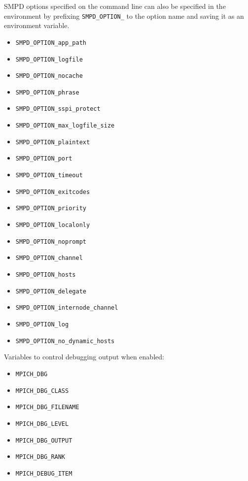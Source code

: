 \documentclass[dvipdfm,11pt]{article}
\begin{document}
SMPD options specified on the command line can also be specified in the environment
by prefixing \texttt{SMPD\_OPTION\_} to the option name and saving it as an
environment variable.
\begin{itemize}
\item \texttt{SMPD\_OPTION\_app\_path}
\item \texttt{SMPD\_OPTION\_logfile}
\item \texttt{SMPD\_OPTION\_nocache}
\item \texttt{SMPD\_OPTION\_phrase}
\item \texttt{SMPD\_OPTION\_sspi\_protect}
\item \texttt{SMPD\_OPTION\_max\_logfile\_size}
\item \texttt{SMPD\_OPTION\_plaintext}
\item \texttt{SMPD\_OPTION\_port}
\item \texttt{SMPD\_OPTION\_timeout}
\item \texttt{SMPD\_OPTION\_exitcodes}
\item \texttt{SMPD\_OPTION\_priority}
\item \texttt{SMPD\_OPTION\_localonly}
\item \texttt{SMPD\_OPTION\_noprompt}
\item \texttt{SMPD\_OPTION\_channel}
\item \texttt{SMPD\_OPTION\_hosts}
\item \texttt{SMPD\_OPTION\_delegate}
\item \texttt{SMPD\_OPTION\_internode\_channel}
\item \texttt{SMPD\_OPTION\_log}
\item \texttt{SMPD\_OPTION\_no\_dynamic\_hosts}
\end{itemize}

Variables to control debugging output when enabled:
\begin{itemize}
\item \texttt{MPICH\_DBG}
\item \texttt{MPICH\_DBG\_CLASS}
\item \texttt{MPICH\_DBG\_FILENAME}
\item \texttt{MPICH\_DBG\_LEVEL}
\item \texttt{MPICH\_DBG\_OUTPUT}
\item \texttt{MPICH\_DBG\_RANK}
\item \texttt{MPICH\_DEBUG\_ITEM}
\end{itemize}
\end{document}

